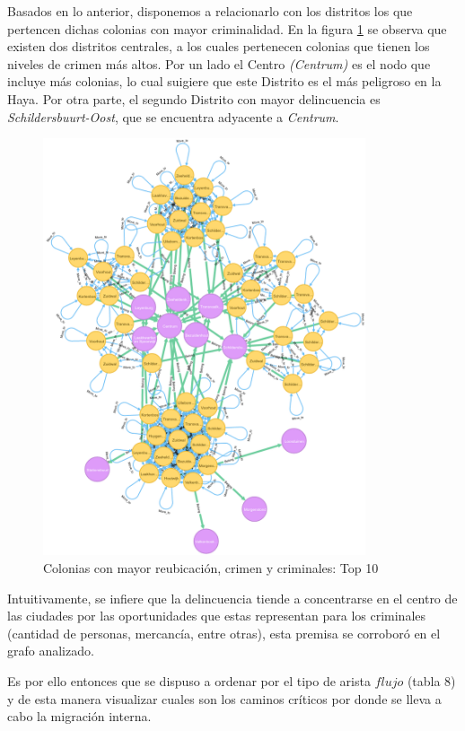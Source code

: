 \documentclass[letterpaper, 10 pt, conference]{ieeeconf}  %
\begin{document}


Basados en lo anterior, disponemos a relacionarlo con los distritos los que pertencen dichas colonias con mayor criminalidad. En la figura \ref{tab:reu_cri_crim} se observa que existen dos distritos centrales, a los cuales pertenecen colonias que tienen los niveles de crimen m\'as altos. Por un lado el Centro \textit{(Centrum)} 
es el nodo que incluye más colonias, lo cual suigiere que este Distrito es el m\'as peligroso en la Haya. Por otra parte, el segundo Distrito con mayor delincuencia es \textit{Schildersbuurt-Oost}, que se encuentra adyacente a \textit{Centrum}.  

\begin{figure}[ht]
\includegraphics[width=9.5cm]{topcrime_belong1.png}
\caption{Colonias con mayor reubicaci\'on, crimen y criminales: Top 10}
\label{tab:reu_cri_crim}
\end{figure}

Intuitivamente, se infiere que la delincuencia tiende a concentrarse en el centro de las ciudades por las oportunidades que estas representan para los criminales (cantidad de personas, mercanc\'ia, entre otras), esta premisa se corrobor\'o en el grafo analizado.

Es por ello entonces que se dispuso a ordenar por el tipo de arista $flujo$ (tabla 8) y de esta manera visualizar cuales son los caminos cr\'iticos por donde se lleva a cabo la migraci\'on interna.
\end{document}
